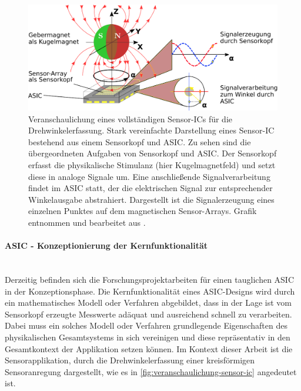 \clearpage


\begin{figure}[tbph]
	\centering
	\includegraphics[width=\linewidth]{chapters/images/Veranschaulichung_Sensor-IC}
	\caption[Veranschaulichung eines vollständigen Sensor-ICs für die Drehwinkelerfassung]{Veranschaulichung eines 
	vollständigen Sensor-ICs für die Drehwinkelerfassung. Stark vereinfachte Darstellung eines Sensor-IC bestehend aus 
	einem Sensorkopf und ASIC. Zu sehen sind die übergeordneten Aufgaben von Sensorkopf und ASIC. Der Sensorkopf 
	erfasst die physikalische Stimulanz (hier Kugelmagnetfeld) und setzt diese in analoge Signale um. Eine 
	anschließende Signalverarbeitung findet im ASIC statt, der die elektrischen Signal zur entsprechender Winkelausgabe 
	abstrahiert. Dargestellt ist die Signalerzeugung eines einzelnen Punktes auf dem magnetischen Sensor-Arrays. Grafik 
	entnommen und bearbeitet aus \cite{Schuethe2020}.}
	\label{fig:veranschaulichung-sensor-ic}
\end{figure}


\paragraph{ASIC - Konzeptionierung der Kernfunktionalität}\label{par:asic-konzeptionierung-der-kernfuntionalitaet}$~$\\


Derzeitig befinden sich die Forschungsprojektarbeiten für einen tauglichen ASIC in der Konzeptionsphase. Die Kernfunktionalität eines ASIC-Designs wird durch ein mathematisches Modell oder Verfahren abgebildet, dass in der Lage ist vom Sensorkopf erzeugte Messwerte adäquat und ausreichend schnell zu verarbeiten. Dabei muss ein solches Modell oder Verfahren grundlegende Eigenschaften des physikalischen Gesamtsystems in sich vereinigen und diese repräsentativ in den Gesamtkontext der Applikation setzen können. Im Kontext dieser Arbeit ist die Sensorapplikation, durch die Drehwinkelerfassung einer kreisförmigen Sensoranregung dargestellt, wie es in \autoref{fig:veranschaulichung-sensor-ic} angedeutet ist.


